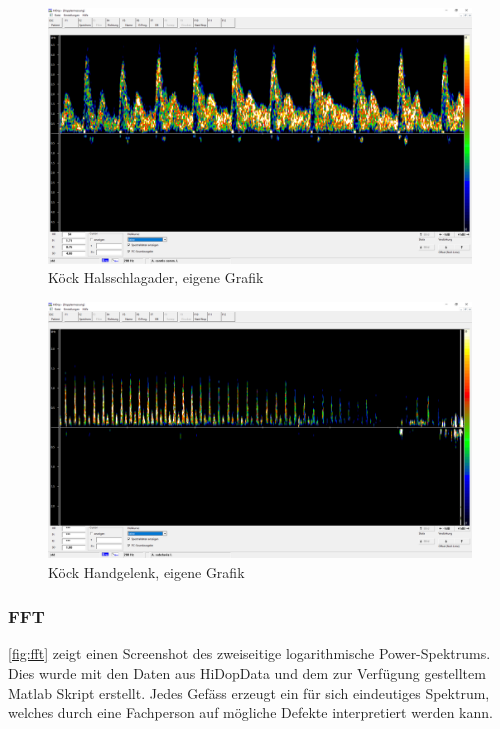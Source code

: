 \documentclass[11pt]{scrartcl}
\begin{document}
    \begin{figure}[H]
        \includegraphics[width=15cm]{images/Leona_Hals.png}
        \caption{Köck Halsschlagader, eigene Grafik}
    \end{figure}
    \begin{figure}[H]
        \includegraphics[width=15cm]{images/Leona_Handgelenk.png}
        \caption{Köck Handgelenk, eigene Grafik}
    \end{figure}

    \pagebreak

    \subsubsection{FFT}

    \autoref{fig:fft} zeigt einen Screenshot des zweiseitige logarithmische Power-Spektrums.
    Dies wurde mit den Daten aus HiDopData und dem zur Verfügung gestelltem Matlab Skript erstellt.
    Jedes Gefäss erzeugt ein für sich eindeutiges Spektrum, welches durch eine Fachperson auf mögliche Defekte interpretiert werden kann.
\end{document}

